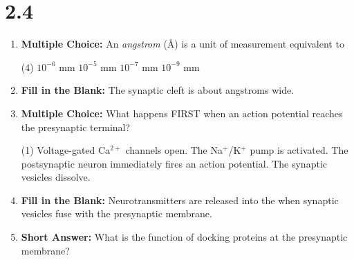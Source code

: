 \section*{2.4}
\begin{enumerate}[label=\textbf{Q2.4.\arabic*}]
      
      \item \textbf{Multiple Choice:} An \textit{angstrom} (\AA) is a unit of measurement equivalent to
      \begin{tasks}[label=(\Alph*), label-width=1.5em, item-indent=1.7em](4)
            \task \(10^{-6}\) mm
            \task \(10^{-5}\) mm
            \task \(10^{-7}\) mm
            \task \(10^{-9}\) mm
      \end{tasks}
      
      \item \textbf{Fill in the Blank:} The synaptic cleft is about \underline{\hspace{3cm}} angstroms wide. \\

      \item \textbf{Multiple Choice:} What happens FIRST when an action potential reaches the presynaptic terminal?
            \begin{tasks}[label=(\Alph*), label-width=1.5em, item-indent=1.7em](1)
                  \task Voltage-gated Ca\(^{2+}\) channels open.
                  \task The Na\(^+\)/K\(^+\) pump is activated.
                  \task The postsynaptic neuron immediately fires an action potential.
                  \task The synaptic vesicles dissolve.
            \end{tasks}

      \item \textbf{Fill in the Blank:} Neurotransmitters are released into the \underline{\hspace{3cm}} when synaptic vesicles fuse with the presynaptic membrane. \\

      \item \textbf{Short Answer:} What is the function of docking proteins at the presynaptic membrane? \\

            
            

\end{enumerate}

